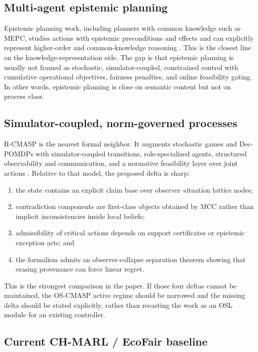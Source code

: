 \documentclass[11pt]{article}
\newcommand{\1}{\mathbf{1}}
\theoremstyle{definition}
\theoremstyle{plain}
\theoremstyle{remark}
\begin{document}
\subsection{Multi-agent epistemic planning}

Epistemic planning work, including planners with common knowledge such as MEPC, studies actions with epistemic preconditions and effects and can explicitly represent higher-order and common-knowledge reasoning \citep{LiuLiu2018MEP}. This is the closest line on the knowledge-representation side. The gap is that epistemic planning is usually not framed as stochastic, simulator-coupled, constrained control with cumulative operational objectives, fairness penalties, and online feasibility gating. In other words, epistemic planning is close on semantic content but not on process class.

\subsection{Simulator-coupled, norm-governed processes}

R-CMASP is the nearest formal neighbor. It augments stochastic games and Dec-POMDPs with simulator-coupled transitions, role-specialized agents, structured observability and communication, and a normative feasibility layer over joint actions \citep{Dong2025RCMASP}. Relative to that model, the proposed delta is sharp:

\begin{enumerate}[leftmargin=1.7em,label=\arabic*.]
\item the state contains an explicit claim base over observer--situation lattice nodes;
\item contradiction components are first-class objects obtained by MCC rather than implicit inconsistencies inside local beliefs;
\item admissibility of critical actions depends on support certificates or epistemic exception acts; and
\item the formalism admits an observer-collapse separation theorem showing that erasing provenance can force linear regret.
\end{enumerate}

This is the strongest comparison in the paper. If those four deltas cannot be maintained, the OS-CMASP active regime should be narrowed and the missing delta should be stated explicitly, rather than recasting the work as an OSL module for an existing controller.

\subsection{Current CH-MARL / EcoFair baseline}
\end{document}
